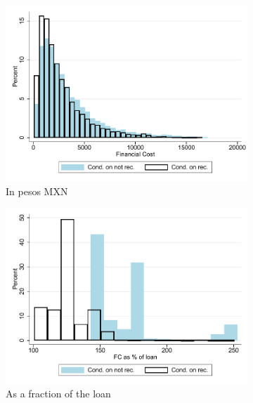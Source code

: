 \documentclass[oneside,11pt]{article}
\begin{document}
\vspace{.2in}
\begin{figure}[H]
     \caption{Financial cost}
    \label{fc_hist}
    \begin{center}
    \begin{subfigure}{.45\textwidth}
      \caption{In pesos MXN}
        \centering
        \includegraphics[width=\textwidth]{Figuras/hist_fc.pdf}
    \end{subfigure}
    \begin{subfigure}{0.45\textwidth}
    \caption{As a fraction of the loan}
       \centering
      \includegraphics[width=\textwidth]{Figuras/hist_fc_perc_loan.pdf}
    \end{subfigure}
     \begin{subfigure}{0.45\textwidth}

\end{subfigure}
\end{center}
\end{figure}
\end{document}
